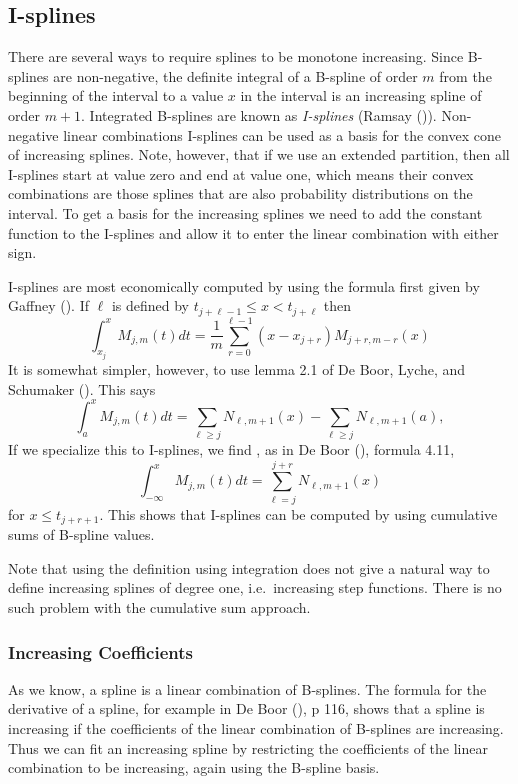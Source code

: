 \documentclass[
  12pt,
  letterpaper,
  DIV=11,
  numbers=noendperiod]{scrreprt}
\theoremstyle{remark}
\begin{document}
\subsection{I-splines}\label{mathisplines}

There are several ways to require splines to be monotone increasing.
Since B-splines are non-negative, the definite integral of a B-spline of
order \(m\) from the beginning of the interval to a value \(x\) in the
interval is an increasing spline of order \(m+1\). Integrated B-splines
are known as \emph{I-splines} (Ramsay ()).
Non-negative linear combinations I-splines can be used as a basis for
the convex cone of increasing splines. Note, however, that if we use an
extended partition, then all I-splines start at value zero and end at
value one, which means their convex combinations are those splines that
are also probability distributions on the interval. To get a basis for
the increasing splines we need to add the constant function to the
I-splines and allow it to enter the linear combination with either sign.

I-splines are most economically computed by using the formula first
given by Gaffney (). If \(\ell\) is
defined by \(t_{j+\ell-1}\leq x<t_{j+\ell}\) then \[
\int_{x_j}^x M_{j,m}(t)dt=\frac{1}{m}\sum_{r=0}^{ \ell-1}(x-x_{j+r})M_{j+r,m-r}(x)
\] It is somewhat simpler, however, to use lemma 2.1 of De Boor, Lyche,
and Schumaker (). This
says \[
\int_a^xM_{j,m}(t)dt=\sum_{\ell\geq j}N_{\ell,m+1}(x)-\sum_{\ell\geq j}N_{\ell,m+1}(a),
\] If we specialize this to I-splines, we find , as in De Boor
(), formula 4.11, \[
\int_{-\infty}^x M_{j,m}(t)dt=\sum_{\ell=j}^{j+r}N_{\ell,m+1}(x)
\] for \(x\leq t_{j+r+1}\). This shows that I-splines can be computed by
using cumulative sums of B-spline values.

Note that using the definition using integration does not give a natural
way to define increasing splines of degree one, i.e.~increasing step
functions. There is no such problem with the cumulative sum approach.

\subsubsection{Increasing Coefficients}\label{increasing-coefficients}

As we know, a spline is a linear combination of B-splines. The formula
for the derivative of a spline, for example in De Boor
(), p 116, shows that a spline is
increasing if the coefficients of the linear combination of B-splines
are increasing. Thus we can fit an increasing spline by restricting the
coefficients of the linear combination to be increasing, again using the
B-spline basis.
\end{document}

